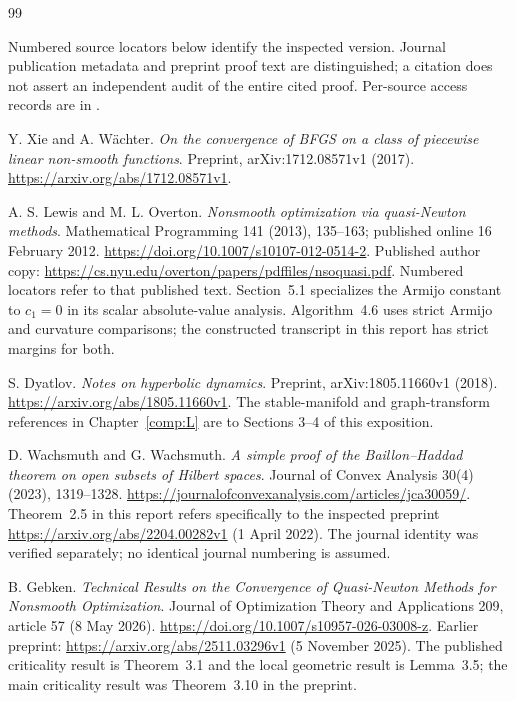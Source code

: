 \begin{thebibliography}{99}
\item[] Numbered source locators below identify the inspected version. Journal publication metadata and preprint proof text are distinguished; a citation does not assert an independent audit of the entire cited proof. Per-source access records are in .

Y. Xie and A. W\"achter. \emph{On the convergence of BFGS on a class of piecewise linear non-smooth functions}. Preprint, arXiv:1712.08571v1 (2017). \url{https://arxiv.org/abs/1712.08571v1}.

A. S. Lewis and M. L. Overton. \emph{Nonsmooth optimization via quasi-Newton methods}. Mathematical Programming 141 (2013), 135--163; published online 16 February 2012. \url{https://doi.org/10.1007/s10107-012-0514-2}. Published author copy: \url{https://cs.nyu.edu/overton/papers/pdffiles/nsoquasi.pdf}. Numbered locators refer to that published text. Section~5.1 specializes the Armijo constant to $c_1=0$ in its scalar absolute-value analysis. Algorithm~4.6 uses strict Armijo and curvature comparisons; the constructed transcript in this report has strict margins for both.

S. Dyatlov. \emph{Notes on hyperbolic dynamics}. Preprint, arXiv:1805.11660v1 (2018). \url{https://arxiv.org/abs/1805.11660v1}. The stable-manifold and graph-transform references in Chapter~\ref{comp:L} are to Sections 3--4 of this exposition.

D. Wachsmuth and G. Wachsmuth. \emph{A simple proof of the Baillon--Haddad theorem on open subsets of Hilbert spaces}. Journal of Convex Analysis 30(4) (2023), 1319--1328. \url{https://journalofconvexanalysis.com/articles/jca30059/}. Theorem~2.5 in this report refers specifically to the inspected preprint \url{https://arxiv.org/abs/2204.00282v1} (1 April 2022). The journal identity was verified separately; no identical journal numbering is assumed.

B. Gebken. \emph{Technical Results on the Convergence of Quasi-Newton Methods for Nonsmooth Optimization}. Journal of Optimization Theory and Applications 209, article 57 (8 May 2026). \url{https://doi.org/10.1007/s10957-026-03008-z}. Earlier preprint: \url{https://arxiv.org/abs/2511.03296v1} (5 November 2025). The published criticality result is Theorem~3.1 and the local geometric result is Lemma~3.5; the main criticality result was Theorem~3.10 in the preprint.


\end{thebibliography}
